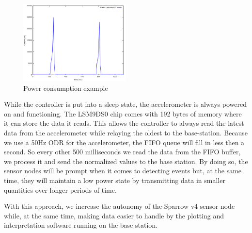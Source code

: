 \begin{figure}[ht] \centering
  \includegraphics[width=0.5\textwidth]{img/power-graph.png}
  \caption{Power consumption example}
  \label{power}
\end{figure}

While the controller is put into a sleep state, the accelerometer is always powered on and functioning. The LSM9DS0 chip comes with 192 bytes of memory where it can store the data it reads. This allows the controller to always read the latest data from the accelerometer while relaying the oldest to the base-station. Because we use a 50Hz ODR for the accelerometer, the FIFO queue will fill in less then a second. So every other 500 milliseconds we read the data from the FIFO buffer, we process it and send the normalized values to the base station. By doing so, the sensor nodes will be prompt when it comes to detecting events but, at the same time, they will maintain a low power state by transmitting data in smaller quantities over longer periods of time.

With this approach, we increase the autonomy of the Sparrow v4 sensor node while, at the same time, making data easier to handle by the plotting and interpretation software running 
on the base station.
